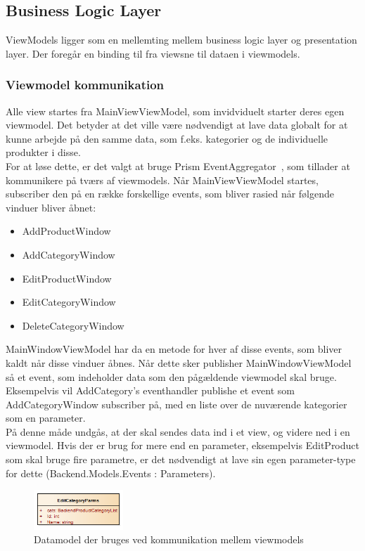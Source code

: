 \subsection{Business Logic Layer}
ViewModels ligger som en mellemting mellem business logic layer og presentation layer. Der foregår en binding til fra viewsne til dataen i viewmodels.




\subsubsection{Viewmodel kommunikation}
\label{viewcomm}
Alle view startes fra MainViewViewModel, som invidviduelt starter deres egen viewmodel. Det betyder at det ville være nødvendigt at lave data globalt for at kunne arbejde på den samme data, som f.eks. kategorier og de individuelle produkter i disse. \\
For at løse dette, er det valgt at bruge Prism EventAggregator~\cite{PRISM}, som tillader at kommunikere på tværs af viewmodels. Når MainViewViewModel startes, subscriber den på en række forskellige events, som bliver rasied når følgende vinduer bliver åbnet:

\begin{itemize}
\item AddProductWindow
\item AddCategoryWindow
\item EditProductWindow
\item EditCategoryWindow
\item DeleteCategoryWindow
\end{itemize}


MainWindowViewModel har da en metode for hver af disse events, som bliver kaldt når disse vinduer åbnes. Når dette sker publisher MainWindowViewModel så et event, som indeholder data som den pågældende viewmodel skal bruge. Eksempelvis vil AddCategory’s eventhandler publishe et event som AddCategoryWindow subscriber på, med en liste over de nuværende kategorier som en parameter.\\

På denne måde undgås, at der skal sendes data ind i et view, og videre ned i en viewmodel. Hvis der er brug for mere end en parameter, eksempelvis EditProduct som skal bruge fire parametre, er det nødvendigt at lave sin egen parameter-type for dette  (Backend.Models.Events : Parameters).

\begin{figure}[H]
    \centering
    \includegraphics[width=0.3\textwidth]{Systemdesign/backend/Images/parms.png}
    \caption{Datamodel der bruges ved kommunikation mellem viewmodels}
    \label{fig:editparms}
\end{figure}


